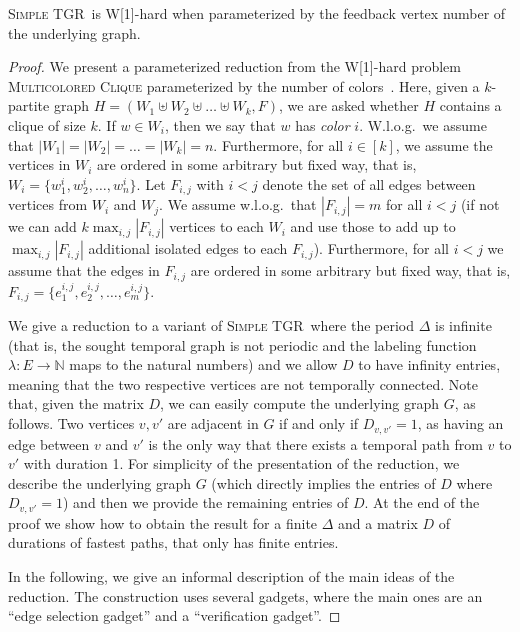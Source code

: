 \documentclass[a4paper,UKenglish,cleveref, autoref, thm-restate]{lipics-v2021}
\newcommand{\deltaExact}{\textsc{Simple TGR}}
\begin{document}
\begin{theorem}\label{thm:W1wrtFVS}
    \deltaExact\ is W[1]-hard when parameterized by the feedback vertex number of the underlying graph.
\end{theorem}
\begin{proof}
    We present a parameterized reduction from the W[1]-hard problem \textsc{Multicolored Clique} parameterized by the number of colors~\cite{fellows2009multipleinterval}.  Here, given a $k$-partite graph $H=(W_1\uplus W_2 \uplus\ldots\uplus W_k, F)$, we are asked whether $H$ contains a clique of size $k$. If $w\in W_i$, then we say that $w$ has \emph{color} $i$. W.l.o.g.\ we assume that $|W_1|=|W_2|=\ldots=|W_k|=n$. 
    Furthermore, for all $i\in[k]$, we assume the vertices in $W_i$ are ordered in some arbitrary but fixed way, that is, $W_i=\{w^i_1,w^i_2,\ldots,w^i_n\}$.
    Let $F_{i,j}$ with $i<j$ denote the set of all edges between vertices from $W_i$ and $W_j$. We assume w.l.o.g.\ that $|F_{i,j}|=m$ for all $i< j$  (if not we can add $k \max_{i,j}|F_{i,j}|$ vertices to each $W_i$ and use those to add up to $\max_{i,j}|F_{i,j}|$ additional isolated edges to each $F_{i,j}$).
    Furthermore, for all $i<j$ we assume that the edges in $F_{i,j}$ are ordered in some arbitrary but fixed way, that is, $F_{i,j}=\{e^{i,j}_1,e^{i,j}_2,\ldots,e^{i,j}_m\}$.

We give a reduction to a variant of \deltaExact\ where the period $\Delta$ is infinite (that is, the sought temporal graph is not periodic and the labeling function $\lambda : E\rightarrow \mathbb{N}$ maps to the natural numbers) and we allow $D$ to have infinity entries, meaning that the two respective vertices are not temporally connected. 
Note that, given the matrix $D$, we can easily compute the underlying graph $G$, as follows. Two vertices $v,v'$ are adjacent in $G$ if and only if $D_{v,v'}=1$, as having an edge between $v$ and $v'$ is the only way that there exists a temporal path from $v$ to $v'$ with duration 1. 
For simplicity of the presentation of the reduction, we describe the underlying graph $G$ (which directly implies the entries of $D$ where $D_{v,v'}=1$) and then we provide the remaining entries of $D$. 
At the end of the proof we show how to obtain the result for a finite $\Delta$ and a matrix $D$ of durations of fastest paths, that only has finite entries.



In the following, we give an informal description of the main ideas of the reduction. The construction uses several gadgets, where the main ones are an ``edge selection gadget'' and a ``verification gadget''.



\end{proof}
\end{document}
